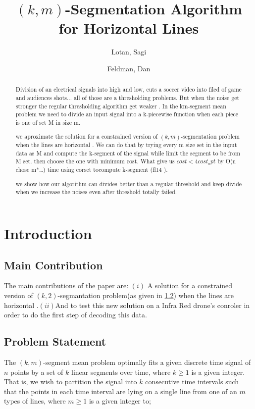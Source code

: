 \documentclass[12pt]{llncs}
\begin{document}
\title{$(k,m)$-Segmentation Algorithm for Horizontal Lines}
\author{Lotan, Sagi\inst{*} \and Feldman, Dan\inst{*} }
\maketitle
\begin{abstract}
   
 Division of an electrical signals into high and low, cuts a soccer video into filed of game and audiences shots... all of those are a thresholding problems. But when the noise get stronger the regular thresholding algorithm get weaker . In the km-segment mean problem we need to divide an input signal into a k-piecewise function when each piece is one of set M in size m.

we aproximate the solution for a constrained version of $(k,m)$-segmentation problem when the lines are horizontal . We can do that by trying every m size set in the input data as M and compute the k-segment of the signal while limit the segment to be from M set. then choose the one with minimum cost. What give us $cost<4cost_opt$ by O(n chose m*…) time using corset tocompute k-segment (fl14 ).

we show how our algorithm can divides better than a regular threshold and keep divide when we increase the noises even after threshold totally failed.
\end{abstract}

\section{Introduction}
\subsection{Main Contribution}
The main contributions of the paper are: $(i)$ A solution for a constrained version of $(k,2)$-segmantation problem(as given in \ref{Problem Statement}) 
when the lines are horizontal .$(ii)$And to test this new solution on a Infra Red drone's conroler in order to do the first step of decoding this data.

\subsection{Problem Statement} \label{Problem Statement}
The $(k,m)$-segment mean problem optimally fits a given discrete time signal of $n$ points
by a set of $k$ linear segments over time,
where $k\geq1$ is a given integer. That is, we wish to
partition the signal into $k$ consecutive time intervals such that the points in each time
interval are lying on a single line from one of an $m$ types of lines, where $m\geq1$ is a given integer to;
\end{document}

